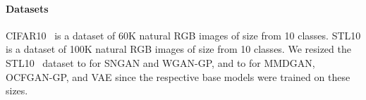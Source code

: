 \documentclass{article} \usepackage{iclr2021_conference,times}
\begin{document}
\begin{table*}
	\centering
	\caption{\small Network architectures used for MMDGAN and VAE models.}
	\label{tab:network-arch}
	\qquad
\end{table*}

\paragraph{Datasets} CIFAR10~\citep{krizhevsky2009learning} is a dataset of 60K natural RGB images of size  from 10 classes. STL10 is a dataset of 100K natural RGB images of size  from 10 classes. We resized the STL10~\citep{coates2011analysis} dataset to  for SNGAN and WGAN-GP, and to  for MMDGAN, OCFGAN-GP, and VAE since the respective base models were trained on these sizes.  
\end{document}
